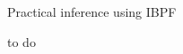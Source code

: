 \documentclass{beamer}
\begin{document}
\begin{frame}{Practical inference using IBPF}
  \bi
  \item to do

  \ei
  
  \end{frame}


  


  


    

\end{document}
